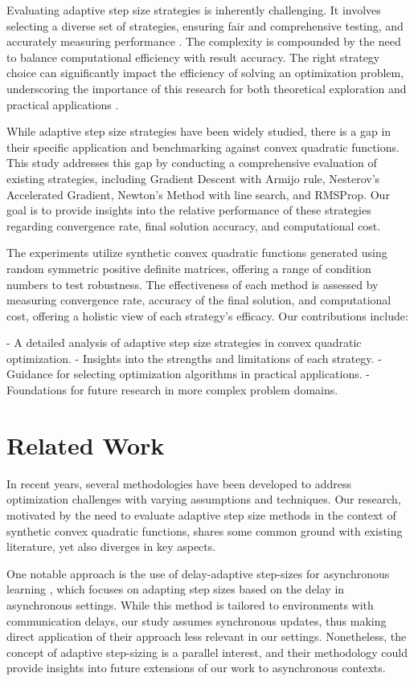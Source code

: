 \documentclass[11pt]{article}
\begin{document}
Evaluating adaptive step size strategies is inherently challenging. It involves selecting a diverse set of strategies, ensuring fair and comprehensive testing, and accurately measuring performance \cite{Robles-Kelly2019IncorporatingTB}. The complexity is compounded by the need to balance computational efficiency with result accuracy. The right strategy choice can significantly impact the efficiency of solving an optimization problem, underscoring the importance of this research for both theoretical exploration and practical applications \cite{Tovbis2024NewtonianPO}.

While adaptive step size strategies have been widely studied, there is a gap in their specific application and benchmarking against convex quadratic functions. This study addresses this gap by conducting a comprehensive evaluation of existing strategies, including Gradient Descent with Armijo rule, Nesterov's Accelerated Gradient, Newton's Method with line search, and RMSProp. Our goal is to provide insights into the relative performance of these strategies regarding convergence rate, final solution accuracy, and computational cost.

The experiments utilize synthetic convex quadratic functions generated using random symmetric positive definite matrices, offering a range of condition numbers to test robustness. The effectiveness of each method is assessed by measuring convergence rate, accuracy of the final solution, and computational cost, offering a holistic view of each strategy's efficacy. Our contributions include:

- A detailed analysis of adaptive step size strategies in convex quadratic optimization.
- Insights into the strengths and limitations of each strategy.
- Guidance for selecting optimization algorithms in practical applications.
- Foundations for future research in more complex problem domains.

\section{Related Work}

In recent years, several methodologies have been developed to address optimization challenges with varying assumptions and techniques. Our research, motivated by the need to evaluate adaptive step size methods in the context of synthetic convex quadratic functions, shares some common ground with existing literature, yet also diverges in key aspects.

One notable approach is the use of delay-adaptive step-sizes for asynchronous learning \cite{Wu2022DelayadaptiveSF}, which focuses on adapting step sizes based on the delay in asynchronous settings. While this method is tailored to environments with communication delays, our study assumes synchronous updates, thus making direct application of their approach less relevant in our settings. Nonetheless, the concept of adaptive step-sizing is a parallel interest, and their methodology could provide insights into future extensions of our work to asynchronous contexts.
\end{document}
